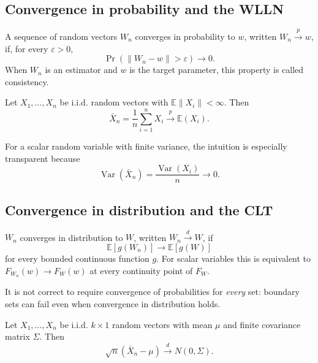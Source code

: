 \subsection{Convergence in probability and the WLLN}

\begin{definition}
A sequence of random vectors $W_n$ converges in probability to $w$, written
$W_n\stackrel{p}{\longrightarrow}w$, if, for every $\varepsilon>0$,
\[
  \Pr(\lVert W_n-w\rVert>\varepsilon)\longrightarrow0.
\]
When $W_n$ is an estimator and $w$ is the target parameter, this property is
called consistency.
\end{definition}

\begin{theorem}
Let $X_1,\ldots,X_n$ be i.i.d. random vectors with
$\mathbb E\lVert X_i\rVert<\infty$.  Then
\[
  \bar X_n=\frac1n\sum_{i=1}^n X_i
  \stackrel{p}{\longrightarrow}\mathbb E(X_i).
\]
\end{theorem}

For a scalar random variable with finite variance, the intuition is especially
transparent because
\[
  \operatorname{Var}(\bar X_n)=\frac{\operatorname{Var}(X_i)}{n}\longrightarrow0.
\]

\subsection{Convergence in distribution and the CLT}

\begin{definition}
$W_n$ converges in distribution to $W$, written
$W_n\stackrel{d}{\longrightarrow}W$, if
\[
  \mathbb E[g(W_n)]\longrightarrow\mathbb E[g(W)]
\]
for every bounded continuous function $g$.  For scalar variables this is
equivalent to $F_{W_n}(w)\to F_W(w)$ at every continuity point of $F_W$.
\end{definition}

It is not correct to require convergence of probabilities for \emph{every}
set: boundary sets can fail even when convergence in distribution holds.

\begin{theorem}
Let $X_1,\ldots,X_n$ be i.i.d. $k\times1$ random vectors with mean $\mu$ and
finite covariance matrix $\Sigma$.  Then
\[
  \sqrt n(\bar X_n-\mu)
  \stackrel{d}{\longrightarrow}N(0,\Sigma).
\]
\end{theorem}

